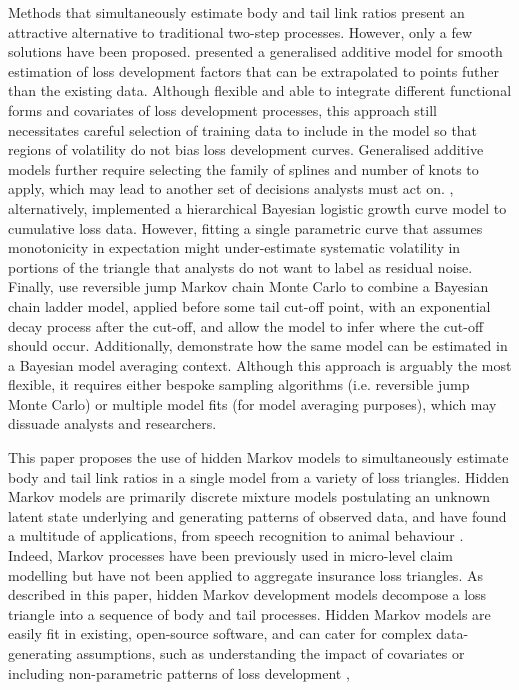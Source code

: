 Methods that simultaneously estimate body
and tail link ratios 
present an attractive alternative
to traditional two-step processes. However, only a few
solutions have been proposed.
\cite{englandverrall2001} presented a generalised
additive model for smooth estimation of loss development
factors that can be extrapolated to points futher
than the existing data. Although flexible and able to
integrate different functional forms and covariates
of loss development processes, this approach
still necessitates careful selection of training data
to include in the model so that regions of volatility
do not bias loss development curves. Generalised additive models
further require selecting the family of splines and
number of knots to apply, which may lead to another
set of decisions analysts must act on.
\cite{zhang2012}, alternatively,
implemented a hierarchical Bayesian logistic growth curve model to
cumulative loss data. However, fitting a single parametric
curve that assumes monotonicity in expectation might under-estimate
systematic volatility in portions of the triangle that
analysts do not want to label as residual noise.
Finally, \cite{verrall2012} use reversible jump Markov
chain Monte Carlo to combine a Bayesian chain ladder model,
applied before some tail cut-off point, with an exponential
decay process after the cut-off, and allow the model to infer
where the cut-off should occur. Additionally, 
\cite{verrall2015} demonstrate how the same model
can be estimated in a Bayesian model averaging context.
Although this approach is arguably the most flexible,
it requires either bespoke sampling algorithms (i.e. reversible
jump Monte Carlo) or
multiple model fits (for model averaging purposes),
which may dissuade analysts and researchers.

This paper proposes the use of hidden Markov models
to simultaneously estimate body and tail link ratios
in a single model from a variety of loss triangles. 
Hidden Markov models are 
primarily discrete mixture models postulating an unknown 
latent state
underlying and generating patterns of observed data,
and have found a multitude of applications, 
from speech recognition \citep[e.g.][]{rabiner1989}
to animal behaviour \citep[e.g.][]{leos2017}.
Indeed, Markov processes have been previously used
in micro-level claim 
modelling \citep[e.g.][]{hesselager1994} but
have not been applied to aggregate insurance
loss triangles.
As described in this paper, hidden Markov 
development models decompose 
a loss triangle into a sequence of body and tail
processes.
Hidden Markov models are easily fit
in existing, open-source software, and can cater
for complex data-generating assumptions,
such as understanding the impact of covariates
or including non-parametric patterns of loss development 
\citep{englandverrall2001},

